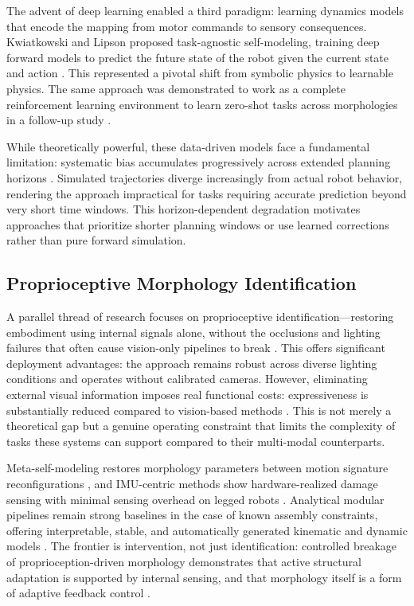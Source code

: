 \documentclass[12pt,a4paper,oneside]{report}
\begin{document}
The advent of deep learning enabled a third paradigm: learning dynamics models that encode the mapping from motor commands to sensory consequences. Kwiatkowski and Lipson proposed task-agnostic self-modeling, training deep forward models to predict the future state of the robot given the current state and action \cite{kwiatkowski2019task}. This represented a pivotal shift from symbolic physics to learnable physics. The same approach was demonstrated to work as a complete reinforcement learning environment to learn zero-shot tasks across morphologies in a follow-up study \cite{kwiatkowski2019zeroshot}.

While theoretically powerful, these data-driven models face a fundamental limitation: systematic bias accumulates progressively across extended planning horizons \cite{kwiatkowski2019task}. Simulated trajectories diverge increasingly from actual robot behavior, rendering the approach impractical for tasks requiring accurate prediction beyond very short time windows. This horizon-dependent degradation motivates approaches that prioritize shorter planning windows or use learned corrections rather than pure forward simulation.

\subsection{Proprioceptive Morphology Identification}

A parallel thread of research focuses on proprioceptive identification---restoring embodiment using internal signals alone, without the occlusions and lighting failures that often cause vision-only pipelines to break \cite{hu2024reconfigurable}. This offers significant deployment advantages: the approach remains robust across diverse lighting conditions and operates without calibrated cameras. However, eliminating external visual information imposes real functional costs: expressiveness is substantially reduced compared to vision-based methods \cite{farghdani2025robust}. This is not merely a theoretical gap but a genuine operating constraint that limits the complexity of tasks these systems can support compared to their multi-modal counterparts.

Meta-self-modeling restores morphology parameters between motion signature reconfigurations \cite{hu2024reconfigurable}, and IMU-centric methods show hardware-realized damage sensing with minimal sensing overhead on legged robots \cite{farghdani2025robust}. Analytical modular pipelines remain strong baselines in the case of known assembly constraints, offering interpretable, stable, and automatically generated kinematic and dynamic models \cite{dogra2022unified}. The frontier is intervention, not just identification: controlled breakage of proprioception-driven morphology demonstrates that active structural adaptation is supported by internal sensing, and that morphology itself is a form of adaptive feedback control \cite{xu2026antenna, yu2026kinematicself}.
\end{document}
